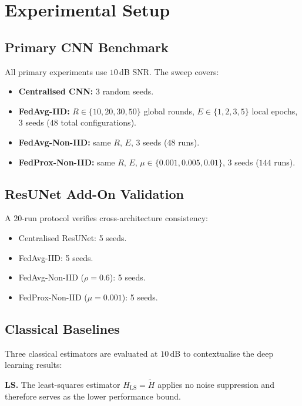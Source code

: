 \documentclass[runningheads]{llncs}
\begin{document}
\section{Experimental Setup}
\label{sec:setup}

\subsection{Primary CNN Benchmark}

All primary experiments use $10$\,dB SNR.  The sweep covers:
\begin{itemize}
  \item \textbf{Centralised CNN:} 3 random seeds.
  \item \textbf{FedAvg-IID:} $R \in \{10, 20, 30, 50\}$ global rounds,
        $E \in \{1, 2, 3, 5\}$ local epochs, 3 seeds
        ($48$ total configurations).
  \item \textbf{FedAvg-Non-IID:} same $R$, $E$, 3 seeds ($48$ runs).
  \item \textbf{FedProx-Non-IID:} same $R$, $E$,
        $\mu \in \{0.001, 0.005, 0.01\}$, 3 seeds ($144$ runs).
\end{itemize}

\subsection{ResUNet Add-On Validation}

A 20-run protocol verifies cross-architecture consistency:
\begin{itemize}
  \item Centralised ResUNet: 5 seeds.
  \item FedAvg-IID: 5 seeds.
  \item FedAvg-Non-IID ($\rho = 0.6$): 5 seeds.
  \item FedProx-Non-IID ($\mu = 0.001$): 5 seeds.
\end{itemize}

\subsection{Classical Baselines}

Three classical estimators are evaluated at $10$\,dB to contextualise
the deep learning results:

\textbf{LS.} The least-squares estimator $\hat{H}_\mathrm{LS} =
\tilde{H}$ applies no noise suppression and therefore serves as the
lower performance bound.
\end{document}
